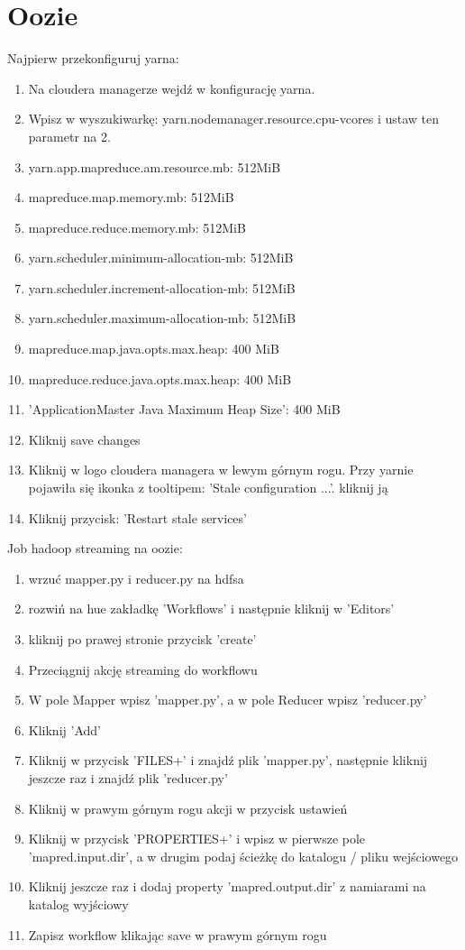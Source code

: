 \documentclass[11pt]{article}
\begin{document}
\section*{Oozie}

Najpierw przekonfiguruj yarna:
\begin{enumerate}
\item Na cloudera managerze wejdź w konfigurację yarna.
\item Wpisz w wyszukiwarkę: yarn.nodemanager.resource.cpu-vcores i ustaw ten parametr na 2.
\item yarn.app.mapreduce.am.resource.mb: 512MiB
\item mapreduce.map.memory.mb: 512MiB
\item mapreduce.reduce.memory.mb: 512MiB
\item yarn.scheduler.minimum-allocation-mb: 512MiB
\item yarn.scheduler.increment-allocation-mb: 512MiB
\item yarn.scheduler.maximum-allocation-mb: 512MiB
\item mapreduce.map.java.opts.max.heap: 400 MiB
\item mapreduce.reduce.java.opts.max.heap: 400 MiB
\item 'ApplicationMaster Java Maximum Heap Size': 400 MiB
\item Kliknij save changes
\item Kliknij w logo cloudera managera w lewym górnym rogu. Przy yarnie pojawiła się ikonka z tooltipem: 'Stale configuration ...'. kliknij ją
\item Kliknij przycisk: 'Restart stale services'
\end{enumerate}

\pagebreak

Job hadoop streaming na oozie:
\begin{enumerate}
\item wrzuć mapper.py i reducer.py na hdfsa
\item rozwiń na hue zakładkę 'Workflows' i następnie kliknij w 'Editors'
\item kliknij po prawej stronie przycisk 'create'
\item Przeciągnij akcję streaming do workflowu
\item W pole Mapper wpisz 'mapper.py', a w pole Reducer wpisz 'reducer.py'
\item Kliknij 'Add'
\item Kliknij w przycisk 'FILES+' i znajdź plik 'mapper.py', następnie kliknij jeszcze raz i znajdź plik 'reducer.py'
\item Kliknij w prawym górnym rogu akcji w przycisk ustawień
\item Kliknij w przycisk 'PROPERTIES+' i wpisz w pierwsze pole 'mapred.input.dir', a w drugim podaj ścieżkę do katalogu / pliku wejściowego
\item Kliknij jeszcze raz i dodaj property 'mapred.output.dir' z namiarami na katalog wyjściowy
\item Zapisz workflow klikając save w prawym górnym rogu
\end{enumerate}
\end{document}
